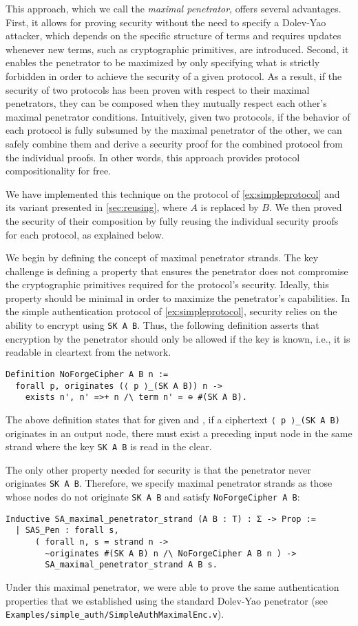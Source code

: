 This approach, which we call the \emph{maximal penetrator}, offers several advantages.
First, it allows for proving security without the need to specify a Dolev-Yao attacker, which depends on the specific structure of terms and requires updates whenever new terms, such as cryptographic primitives, are introduced.
Second, it enables the penetrator to be maximized by only specifying what is strictly forbidden in order to achieve the security of a given protocol.
As a result, if the security of two protocols has been proven with respect to their maximal penetrators, they can be composed when they mutually respect each other's maximal penetrator conditions.
Intuitively, given two protocols,
if the behavior of each protocol is fully subsumed by the maximal penetrator of the other, we can safely combine them and derive a security proof for the combined protocol from the individual proofs.
In other words, this approach provides protocol compositionality for free.

We have implemented this technique on the protocol of \cref{ex:simpleprotocol} and its variant presented in \cref{sec:reusing}, where $A$ is replaced by $B$.
We then proved the security of their composition by fully reusing the individual security proofs for each protocol, as explained below.

We begin by defining the concept of maximal penetrator strands.
The key challenge is defining a property that ensures the penetrator does not compromise the cryptographic primitives required for the protocol's security.
Ideally, this property should be minimal in order to maximize the penetrator’s capabilities.
In the simple authentication protocol of \cref{ex:simpleprotocol}, security relies on the ability to encrypt using \lstinline|SK A B|.
Thus, the following definition asserts that encryption by the penetrator should only be allowed if the key is known, i.e., it is readable in cleartext from the network.
\begin{lstlisting}
Definition NoForgeCipher A B n :=
  forall p, originates (⟨ p ⟩_(SK A B)) n ->
    exists n', n' =>+ n /\ term n' = ⊖ #(SK A B).
\end{lstlisting}
The above definition states that for given \A and \B, if a ciphertext \lstinline|⟨ p ⟩_(SK A B)| originates in an output node, there must exist a preceding input node in the same strand where the key \lstinline|SK A B| is read in the clear.

The only other property needed for security is that the penetrator never originates \lstinline|SK A B|.
Therefore, we specify maximal penetrator strands as those whose nodes do not originate \lstinline|SK A B| and satisfy \lstinline|NoForgeCipher A B|:
\begin{lstlisting}
Inductive SA_maximal_penetrator_strand (A B : T) : Σ -> Prop :=
  | SAS_Pen : forall s,
      ( forall n, s = strand n ->
        ~originates #(SK A B) n /\ NoForgeCipher A B n ) ->
        SA_maximal_penetrator_strand A B s.
\end{lstlisting}
Under this maximal penetrator, we were able to prove the same authentication properties that we established using the standard Dolev-Yao penetrator (see \lstinline{Examples/simple_auth/SimpleAuthMaximalEnc.v}).

